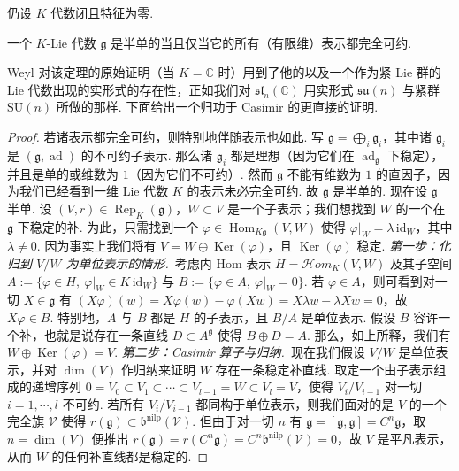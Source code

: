\begin{numpara}[用表示刻画]\label{np:lie-2-4-3}
仍设 $K$ 代数闭且特征为零.
\begin{theorem*}[Weyl]
一个 $K$-Lie 代数 $\mathfrak g$ 是半单的当且仅当它的所有（有限维）表示都完全可约.
\end{theorem*}
Weyl 对该定理的原始证明（当 $K=\mathbb C$ 时）用到了他的以及一个作为紧 Lie 群的 Lie 代数出现的实形式的存在性，正如我们对 $\mathfrak{sl}_n(\mathbb C)$ 用实形式 $\mathfrak{su}(n)$ 与紧群 $\mathrm{SU}(n)$ 所做的那样. 下面给出一个归功于 Casimir 的更直接的证明.
\begin{proof}
若诸表示都完全可约，则特别地伴随表示也如此. 写 $\mathfrak g=\bigoplus_{i}\mathfrak g_{i}$，其中诸 $\mathfrak g_{i}$ 是 $(\mathfrak g,\operatorname{ad})$ 的不可约子表示. 那么诸 $\mathfrak g_{i}$ 都是理想（因为它们在 $\operatorname{ad}_{\mathfrak g}$ 下稳定），并且是单的或维数为 $1$（因为它们不可约）. 然而 $\mathfrak g$ 不能有维数为 $1$ 的直因子，因为我们已经看到一维 Lie 代数 $K$ 的表示未必完全可约. 故 $\mathfrak g$ 是半单的.
现在设 $\mathfrak g$ 半单. 设 $(V,r)\in\operatorname{Rep}_{K}(\mathfrak g)$，$W\subset V$ 是一个子表示；我们想找到 $W$ 的一个在 $\mathfrak g$ 下稳定的补. 为此，只需找到一个 $\varphi\in\operatorname{Hom}_{K\mathfrak g}(V,W)$ 使得 $\varphi|_{W}=\lambda\,\mathrm{id}_{W}$，其中 $\lambda\neq 0$. 因为事实上我们将有 $V=W\oplus\operatorname{Ker}(\varphi)$，且 $\operatorname{Ker}(\varphi)$ 稳定.
\emph{第一步：化归到 $V/W$ 为单位表示的情形.}\ 考虑内 Hom 表示 $H=\mathcal{H}om_{K}(V,W)$ 及其子空间 $A:=\{\varphi\in H,\ \varphi|_{W}\in K\,\mathrm{id}_{W}\}$ 与 $B:=\{\varphi\in A,\ \varphi|_{W}=0\}$. 若 $\varphi\in A$，则可看到对一切 $X\in\mathfrak g$ 有 $(X\varphi)(w)=X\varphi(w)-\varphi(Xw)=X\lambda w-\lambda Xw=0$，故 $X\varphi\in B$. 特别地，$A$ 与 $B$ 都是 $H$ 的子表示，且 $B/A$ 是单位表示. 假设 $B$ 容许一个补，也就是说存在一条直线 $D\subset A^{\mathfrak g}$ 使得 $B\oplus D=A$. 那么，如上所释，我们有 $W\oplus\operatorname{Ker}(\varphi)=V$.
\emph{第二步：Casimir 算子与归纳.}\ 现在我们假设 $V/W$ 是单位表示，并对 $\dim(V)$ 作归纳来证明 $W$ 存在一条稳定补直线. 取定一个由子表示组成的递增序列 $0=V_{0}\subset V_{1}\subset\cdots\subset V_{l-1}=W\subset V_{l}=V$，使得 $V_{i}/V_{i-1}$ 对一切 $i=1,\cdots,l$ 不可约.
若所有 $V_{i}/V_{i-1}$ 都同构于单位表示，则我们面对的是 $V$ 的一个完全旗 $\mathcal V$ 使得 $r(\mathfrak g)\subset\mathfrak b^{\mathrm{nilp}}(\mathcal V)$. 但由于对一切 $n$ 有 $\mathfrak g=[\mathfrak g,\mathfrak g]=C^{n}\mathfrak g$，取 $n=\dim(V)$ 便推出 $r(\mathfrak g)=r(C^{n}\mathfrak g)=C^{n}\mathfrak b^{\mathrm{nilp}}(\mathcal V)=0$，故 $V$ 是平凡表示，从而 $W$ 的任何补直线都是稳定的.

\end{proof}
\end{numpara}
